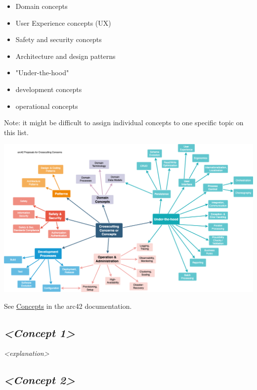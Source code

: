 \documentclass[
]{article}
\begin{document}
\begin{itemize}
\item
  Domain concepts
\item
  User Experience concepts (UX)
\item
  Safety and security concepts
\item
  Architecture and design patterns
\item
  "Under-the-hood"
\item
  development concepts
\item
  operational concepts
\end{itemize}

Note: it might be difficult to assign individual concepts to one
specific topic on this list.

\includegraphics{images/08-concepts-EN.drawio.png}

See \href{https://docs.arc42.org/section-8/}{Concepts} in the arc42
documentation.

\hypertarget{__emphasis_concept_1_emphasis}{%
\subsection{\texorpdfstring{\emph{\textless Concept
1\textgreater{}}}{\textless Concept 1\textgreater{}}}\label{__emphasis_concept_1_emphasis}}

\emph{\textless explanation\textgreater{}}

\hypertarget{__emphasis_concept_2_emphasis}{%
\subsection{\texorpdfstring{\emph{\textless Concept
2\textgreater{}}}{\textless Concept 2\textgreater{}}}\label{__emphasis_concept_2_emphasis}}
\end{document}

